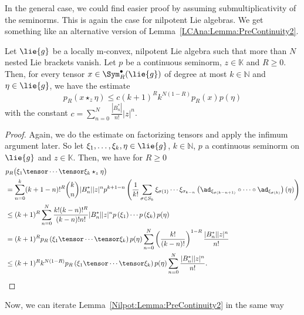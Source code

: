 In the general case, we could find easier proof by assuming submultiplicativity of 
the seminorms. This is again the case for nilpotent Lie algebras. We get something 
like an alternative version of Lemma~\ref{LCAna:Lemma:PreContinuity2}.
\begin{lemma}
	\label{Nilpot:Lemma:PreContinuity2}
	Let $\lie{g}$ be a locally m-convex, nilpotent Lie algebra such that more than 
	$N$ nested Lie brackets vanish. Let $p$ be a continuous seminorm, 
	$z \in \mathbb{K}$ and $R \geq 0$. Then, for every tensor 
	$x \in \Sym_R^{\bullet}(\lie{g})$ of degree at most $k \in \mathbb{N}$ and 
	$\eta \in \lie{g}$, we have the estimate
	\begin{equation}
		\label{Nilpot:PreContinuity}
		p_R \left( x \star_z \eta \right)
		\leq
		c (k + 1)^R k^{N (1-R)}
		p_R (x) p(\eta)
	\end{equation}
	with the constant $c = \sum_{n = 0}^N \frac{|B_n^*|}{n!} |z|^n$.
\end{lemma}
\begin{proof}
	Again, we do the estimate on factorizing tensors and apply the infimum 
	argument later. So let $\xi_1, \ldots, \xi_k, \eta \in \lie{g}$, $k \in 
	\mathbb{N}$, $p$ a continuous seminorm on $\lie{g}$ and $z \in \mathbb{K}$. 
	Then, we have for $R \geq 0$
	\begin{align*}
		&
		p_R 
		\big(
			\xi_1 \tensor \cdots \tensor \xi_k \star_z \eta
		\big)
		\\
		& =
		\sum\limits_{n = 0}^k
		(k + 1 - n)!^R \binom{k}{n}
		|B_n^*| |z|^n
		p^{k + 1 - n} \left(
			\frac{1}{k!}
			\sum\limits_{\sigma \in S_k}
			\xi_{\sigma(1)} \cdots \xi_{\sigma_{k-n}}
			\left( 
				\ad_{\xi_{\sigma(k-n+1)}} 
				\circ \cdots \circ 
				\ad_{\xi_{\sigma(k)}} 
			\right) (\eta)
		\right)
		\\
		& \leq
		(k + 1)^R
		\sum\limits_{n = 0}^N
		\frac{ k! (k-n)!^R }{ (k-n)! n! }
		|B_n^*| |z|^n
		p\left( \xi_1 \right) \cdots p\left( \xi_k \right) 
		p(\eta)
		\\
		& =
		(k + 1)^R
		p_R \left(
			\xi_1 \tensor \cdots \tensor \xi_k
		\right)
		p(\eta)
		\sum\limits_{n = 0}^N
		\left( \frac{k!}{(k-n)!} \right)^{1-R}
		\frac{|B_n^*| |z|^n}{n!}
		\\
		& \leq
		(k + 1)^R
		k^{N (1-R)}
		p_R \left(
			\xi_1 \tensor \cdots \tensor \xi_k
		\right)
		p(\eta)
		\sum\limits_{n = 0}^N
		\frac{|B_n^*| |z|^n}{n!}.
	\end{align*}
\end{proof}
Now, we can iterate Lemma~\ref{Nilpot:Lemma:PreContinuity2} in the same way 

